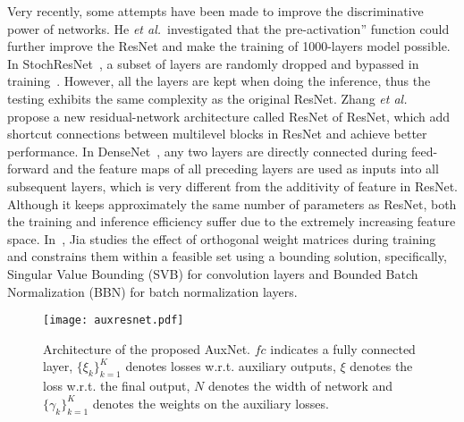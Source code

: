 \documentclass[10pt,onecolumn,letterpaper]{article}
\def\etal{{\em et al.\/}\, }
\def\mark{\textcolor{black}}
\def\etal{{\em et al.\/}\, }
\def\SexyName{AuxNet\xspace}
\begin{document}
Very recently, some attempts have been made to improve the discriminative power of networks.
He \etal investigated that the pre-activation” function could further improve the ResNet and make the training of 1000-layers model possible. In StochResNet~\cite{DBLP:journals/corr/HuangSLSW16}, a subset of layers are randomly dropped and bypassed in training~\cite{DBLP:journals/corr/HuangSLSW16}. However, all the layers are kept when doing the inference, thus the testing exhibits the same complexity as the original ResNet.
Zhang \etal~\cite{zhang2016residual} propose a new residual-network architecture called ResNet of ResNet, which add shortcut connections between multilevel blocks in ResNet and achieve better performance. In DenseNet~\cite{huang2016densely}, any two layers are directly connected during feed-forward and the feature maps of all preceding layers are used as inputs into all subsequent layers, which is very different from the additivity of feature in ResNet.
Although it keeps approximately the same number of parameters as ResNet, both the training and inference efficiency suffer due to the extremely increasing feature space.  In~\cite{jia2016improving}, Jia studies the effect of orthogonal weight matrices during training and constrains them within a feasible set using a bounding solution, specifically, Singular Value Bounding (SVB) for convolution layers and Bounded Batch Normalization (BBN) for batch normalization layers.




\begin{figure}[t]
\begin{center}
   \texttt{[image: auxresnet.pdf]}
\end{center}
   \caption{Architecture of the proposed \SexyName. $fc$ indicates a fully connected layer, $\{\xi_k\}_{k=1}^{K}$ denotes losses w.r.t. auxiliary outputs, $\xi$ denotes the loss w.r.t. the final output, $N$ denotes the width of network and $\{\gamma_k\}_{k=1}^K$ denotes the weights on the auxiliary losses.}
\label{fig:ausresnet}
\vspace{-1em}
\end{figure}
\end{document}
